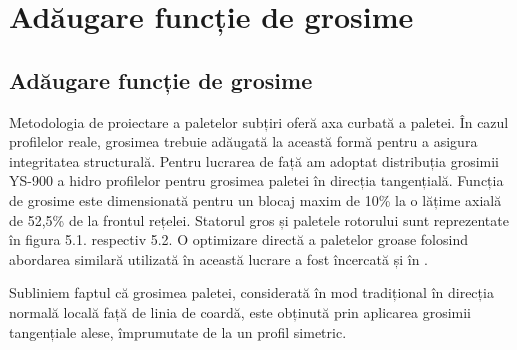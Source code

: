 \chapter{Adăugare funcție de grosime}\label{chapter:grosime}

\section{Adăugare funcție de grosime}

Metodologia de proiectare a paletelor subțiri oferă axa curbată a paletei. În cazul profilelor reale, grosimea trebuie adăugată la această formă pentru a asigura integritatea structurală. Pentru lucrarea de față am adoptat distribuția grosimii YS-900 a hidro profilelor \cite{eppler1979wing} pentru grosimea paletei în direcția tangențială. Funcția de grosime este dimensionată pentru un blocaj maxim de 10\% la o lățime axială de 52,5\% de la frontul rețelei. Statorul gros și paletele rotorului sunt reprezentate în figura 5.1. respectiv 5.2. O optimizare directă a paletelor groase folosind abordarea similară utilizată în această lucrare a fost încercată și în \cite{frunzua2010optimization}.

Subliniem faptul că grosimea paletei, considerată în mod tradițional în direcția normală locală față de linia de coardă, este obținută prin aplicarea grosimii tangențiale alese, împrumutate de la un profil simetric.

